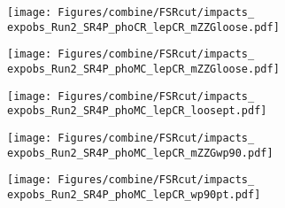 \label{sec:impacts_FSRcut}

\begin{figure}
  \centering
  \texttt{[image: Figures/combine/FSRcut/impacts\_\\expobs\_Run2\_SR4P\_phoCR\_lepCR\_mZZGloose.pdf]}
  \caption{}
  \label{fig:FSRcut_cutID_phoCR_mZZGloose}
\end{figure}

\begin{figure}
  \centering
  \texttt{[image: Figures/combine/FSRcut/impacts\_\\expobs\_Run2\_SR4P\_phoMC\_lepCR\_mZZGloose.pdf]}
  \caption{}
  \label{fig:FSRcut_cutID_phoMC_mZZGloose}
\end{figure}

\begin{figure}
  \centering
  \texttt{[image: Figures/combine/FSRcut/impacts\_\\expobs\_Run2\_SR4P\_phoMC\_lepCR\_loosept.pdf]}
  \caption{}
  \label{fig:FSRcut_cutID_phoMC_loosept}
\end{figure}

\begin{figure}
  \centering
  \texttt{[image: Figures/combine/FSRcut/impacts\_\\expobs\_Run2\_SR4P\_phoMC\_lepCR\_mZZGwp90.pdf]}
  \caption{}
  \label{fig:FSRcut_mvaID_phoMC_mZZGwp90}
\end{figure}

\begin{figure}
  \centering
  \texttt{[image: Figures/combine/FSRcut/impacts\_\\expobs\_Run2\_SR4P\_phoMC\_lepCR\_wp90pt.pdf]}
  \caption{}
  \label{fig:FSRcut_mvaID_phoMC_wp90pt}
\end{figure}


